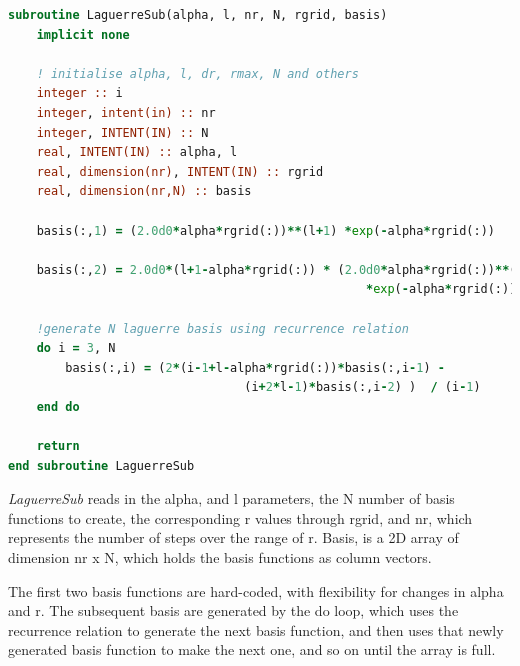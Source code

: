 \documentclass{article}
\begin{document}
\begin{lstlisting}[language=Fortran]
subroutine LaguerreSub(alpha, l, nr, N, rgrid, basis)
	implicit none
	
	! initialise alpha, l, dr, rmax, N and others
	integer :: i
	integer, intent(in) :: nr
	integer, INTENT(IN) :: N
	real, INTENT(IN) :: alpha, l
	real, dimension(nr), INTENT(IN) :: rgrid
	real, dimension(nr,N) :: basis
	
	basis(:,1) = (2.0d0*alpha*rgrid(:))**(l+1) *exp(-alpha*rgrid(:))
	
	basis(:,2) = 2.0d0*(l+1-alpha*rgrid(:)) * (2.0d0*alpha*rgrid(:))**(l+1) 
	                                              *exp(-alpha*rgrid(:))
	
	!generate N laguerre basis using recurrence relation
	do i = 3, N
		basis(:,i) = (2*(i-1+l-alpha*rgrid(:))*basis(:,i-1) - 
		                         (i+2*l-1)*basis(:,i-2) )  / (i-1)
	end do
	
	return
end subroutine LaguerreSub
\end{lstlisting}

    \textit{LaguerreSub} reads in the alpha, and l parameters, the N number of basis functions to create, the corresponding r values through rgrid, and nr, which represents the number of steps over the range of r. Basis, is a 2D array of dimension nr x N, which holds the basis functions as column vectors.
    
    The first two basis functions are hard-coded, with flexibility for changes in alpha and r. The subsequent basis are generated by the do loop, which uses the recurrence relation to generate the next basis function, and then uses that newly generated basis function to make the next one, and so on until the array is full. 
    
\end{document}
